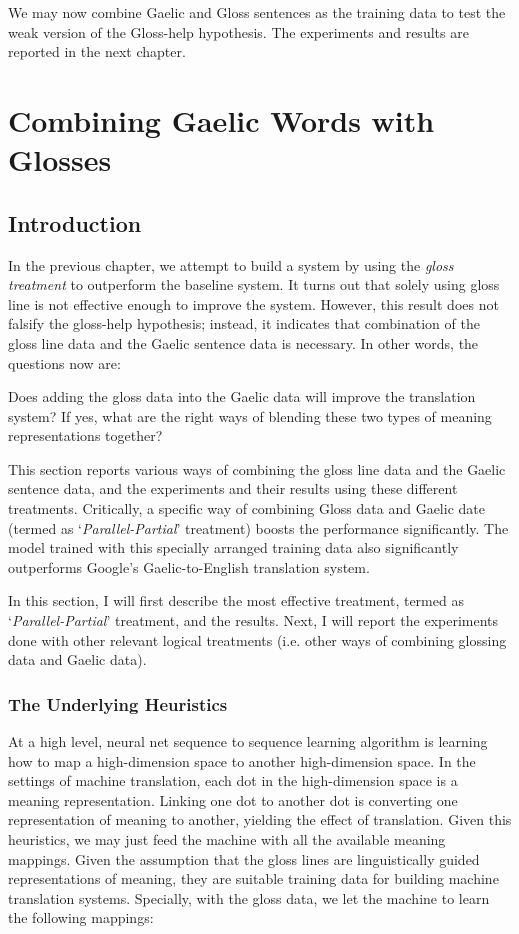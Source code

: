 \documentclass[final]{ua-thesis}
\numberwithin{equation}{section}
\begin{document}
We may now combine Gaelic and Gloss sentences as the training data to test the weak version of the Gloss-help hypothesis. The experiments and results are reported in the next chapter.
\chapter{Combining Gaelic Words with Glosses}\label{chap:cake2}
\section{Introduction}
In the previous chapter, we attempt to build a system by using the \textit{gloss treatment} to outperform the baseline system. It turns out that solely using gloss line is not effective enough to improve the system. However, this result does not falsify the gloss-help hypothesis; instead, it indicates that combination of the gloss line data and the Gaelic sentence data is necessary. In other words, the questions now are: 
\begin{exe}
	\ex 
	\begin{xlist}
		\ex Does adding the gloss data into the Gaelic data will improve the translation system? 
		\ex If yes, what are the right ways of blending these two types of meaning representations together? 
	\end{xlist}	
\end{exe}

This section reports various ways of combining the gloss line data and the Gaelic sentence data, and the experiments and their results using these different treatments. Critically, a specific way of combining Gloss data and Gaelic date (termed as `\textit{Parallel-Partial}' treatment) boosts the performance significantly. The model trained with this specially arranged training data also significantly outperforms Google's Gaelic-to-English translation system.

In this section, I will first describe the most effective treatment, termed as `\textit{Parallel-Partial}' treatment, and the results. Next, I will report the experiments done with other relevant logical treatments (i.e. other ways of combining glossing data and Gaelic data). 

\subsection{The Underlying Heuristics}\label{heuristics}
At a high level, neural net sequence to sequence learning algorithm is learning how to map a high-dimension space to another high-dimension space. In the settings of machine translation, each dot in the high-dimension space is a meaning representation. Linking one dot to another dot is converting one representation of meaning to another, yielding the effect of translation. Given this heuristics, we may just feed the machine with all the available meaning mappings. Given the assumption that the gloss lines are linguistically guided representations of meaning, they are suitable training data for building machine translation systems. Specially, with the gloss data, we let the machine to learn the following mappings:
\end{document}
